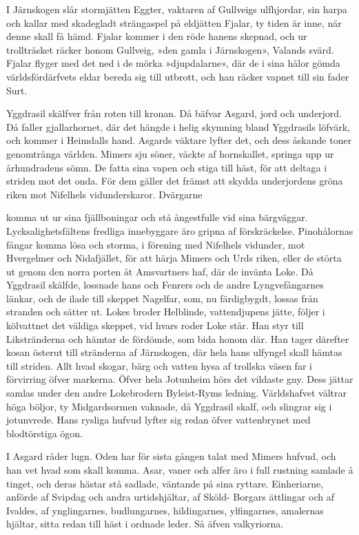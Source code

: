 I Järnskogen slår stormjätten Eggter, vaktaren af Gullveigs ulfhjordar,
sin harpa och kallar med skadegladt strängaspel på eldjätten Fjalar, ty
tiden är inne, när denne skall få hämd. Fjalar kommer i den röde hanens
skepnad, och ur trollträsket räcker honom Gullveig, »den gamla i
Järnskogen», Valands svärd. Fjalar flyger med det ned i de mörka
»djupdalarne», där de i sina hålor gömda världsfördärfvets eldar bereda
sig till utbrott, och han räcker vapnet till sin fader Surt.

Yggdrasil skälfver från roten till kronan. Då bäfvar Asgard, jord och
underjord. Då faller gjallarhornet, där det hängde i helig skymning
bland Yggdrasils löfvärk, och kommer i Heimdalls hand. Asgards väktare
lyfter det, och dess åskande toner genomtränga världen. Mimers sju
söner, väckte af hornskallet, springa upp ur århundradens sömn. De fatta
sina vapen och stiga till häst, för att deltaga i striden mot det onda.
För dem gäller det främst att skydda underjordens gröna riken mot
Nifelhels vidunderskaror. Dvärgarne

komma ut ur sina fjällboningar och stå ångestfulle vid sina bärgväggar.
Lycksalighetsfältens fredliga innebyggare äro gripna af förskräckelse.
Pinohålornas fångar komma lösa och storma, i förening med Nifelhels
vidunder, mot Hvergelmer och Nidafjället, för att härja Mimers och Urds
riken, eller de störta ut genom den norra porten åt Amsvartners haf, där
de invänta Loke. Då Yggdrasil skälfde, lossnade hans och Fenrers och de
andre Lyngvefångarnes länkar, och de ilade till skeppet Nagelfar, som,
nu färdigbygdt, lossas från stranden och sätter ut. Lokes broder
Helblinde, vattendjupens jätte, följer i kölvattnet det väldiga skeppet,
vid hvars roder Loke står. Han styr till Likstränderna och hämtar de
fördömde, som bida honom där. Han tager därefter kosan österut till
stränderna af Järnskogen, där hela hans ulfyngel skall hämtas till
striden. Allt hvad skogar, bärg och vatten hysa af trollska väsen far i
förvirring öfver markerna. Öfver hela Jotunheim hörs det vildaste gny.
Dess jättar samlas under den andre Lokebrodern Byleist-Ryms ledning.
Världshafvet vältrar höga böljor, ty Midgardsormen vaknade, då Yggdrasil
skalf, och slingrar sig i jotunvrede. Hans rysliga hufvud lyfter sig
redan öfver vattenbrynet med blodtörstiga ögon.

I Asgard råder lugn. Oden har för sista gången talat med Mimers hufvud,
och han vet hvad som skall komma. Asar, vaner och alfer äro i full
rustning samlade å tinget, och deras hästar stå sadlade, väntande på
sina ryttare. Einheriarne, anförde af Svipdag och andra urtidshjältar,
af Sköld- Borgars ättlingar och af Ivaldes, af ynglingarnes,
budlungarnes, hildingarnes, ylfingarnes, amalernas hjältar, sitta redan
till häst i ordnade leder. Så äfven valkyriorna.

